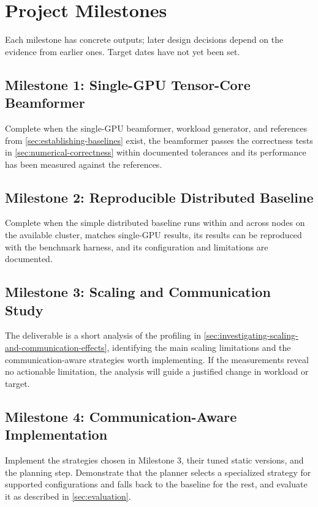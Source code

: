 \section{Project Milestones}
\label{sec:project-milestones}

Each milestone has concrete outputs; later design decisions depend on the evidence from earlier ones. Target dates have not yet been set.

\subsection{Milestone 1: Single-GPU Tensor-Core Beamformer}
\label{sec:milestone-1}

Complete when the single-GPU beamformer, workload generator, and references from \cref{sec:establishing-baselines} exist, the beamformer passes the correctness tests in \cref{sec:numerical-correctness} within documented tolerances and its performance has been measured against the references.

\subsection{Milestone 2: Reproducible Distributed Baseline}
\label{sec:milestone-2}

Complete when the simple distributed baseline runs within and across nodes on the available cluster, matches single-GPU results, its results can be reproduced with the benchmark harness, and its configuration and limitations are documented.

\subsection{Milestone 3: Scaling and Communication Study}
\label{sec:milestone-3}

The deliverable is a short analysis of the profiling in \cref{sec:investigating-scaling-and-communication-effects}, identifying the main scaling limitations and the communication-aware strategies worth implementing. If the measurements reveal no actionable limitation, the analysis will guide a justified change in workload or target.

\subsection{Milestone 4: Communication-Aware Implementation}
\label{sec:milestone-4}

Implement the strategies chosen in Milestone 3, their tuned static versions, and the planning step. Demonstrate that the planner selects a specialized strategy for supported configurations and falls back to the baseline for the rest, and evaluate it as described in \cref{sec:evaluation}.

